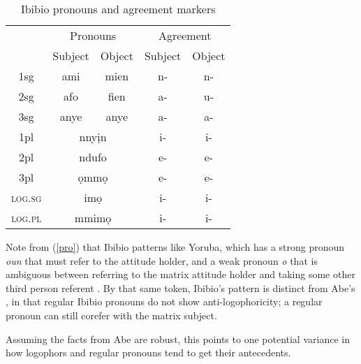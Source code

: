 \documentclass[output=paper]{langscibook}
\begin{document}
\begin{table}
\centering
\begin{tabular}{ccc|cc}
	& \multicolumn{2}{c|}{Pronouns}	&	\multicolumn{2}{c}{Agreement}	\\
	&	Subject		&	Object		&	Subject 	&	Object			\\ \hline
1sg	&	ami	&	mien	&	n- & n-	\\
2sg	&	afo	&	fien	& a-	& u- 		\\
3sg	&	anye	&	anye	& a-	&	a-	\\ \hline
1pl	&	\multicolumn{2}{c|}{nny\d{i}n}	&	i-	&	i-	\\
2pl	&	\multicolumn{2}{c|}{ndufo}	& e-	& e-	\\
3pl	&	\multicolumn{2}{c|}{\d{o}mm\d{o}} & e-		& e- \\ \hline
\textsc{log.sg}	& \multicolumn{2}{c|}{im\d{o}}	&	i-	& i-	\\
\textsc{log.pl}	&	\multicolumn{2}{c|}{mmim\d{o}}	& i-	& i-	\\

\end{tabular}
\caption{Ibibio pronouns and agreement markers}
\end{table}



Note from (\ref{pro}) that Ibibio patterns like Yoruba, which has a strong pronoun \textit{oun} that must refer to the attitude holder, and a weak pronoun \textit{o} that is ambiguous between referring to the matrix attitude holder and taking some other third person referent \citep[(\ref{yor})][]{Adesola2005}. By that same token, Ibibio's pattern is distinct from Abe's \citep[(\ref{abe})]{Koopman1989}, in that regular Ibibio pronouns do not show anti-logophoricity; a regular pronoun can still corefer with the matrix subject.
\begin{exe}
	\label{yor}
	
	\label{abe}
\end{exe}
Assuming the facts from Abe are robust, this points to one potential variance in how logophors and regular pronouns tend to get their antecedents.
\end{document}

